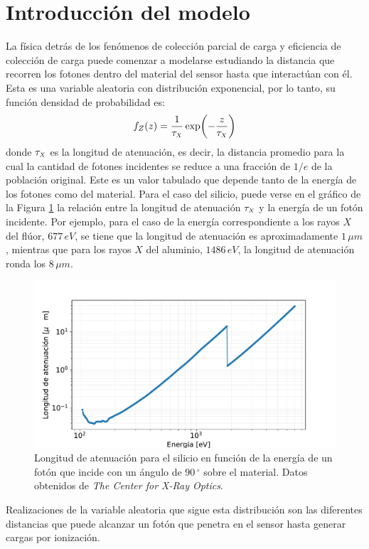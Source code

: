\section{Introducción del modelo}
\noindent La física detrás de los fenómenos de colección parcial de carga y eficiencia de colección de carga puede comenzar a modelarse estudiando la distancia que recorren los fotones dentro del material del sensor hasta que interactúan con él. Esta es una variable aleatoria con distribución exponencial, por lo tanto, su función densidad de probabilidad es:
\begin{equation}
    f_{Z}(z) = \frac{1}{\tau_{\scaleto{X}{4pt}}}\exp(-\frac{z}{\tau_{\scaleto{X}{4pt}}})
        \label{ec:DistribucionDistancias}
\end{equation}
donde $\tau_{\scaleto{X}{4pt}}$ es la longitud de atenuación, es decir, la distancia promedio para la cual la cantidad de fotones incidentes se reduce a una fracción de $1/e$ de la población original. Este es un valor tabulado que depende tanto de la energía de los fotones como del material. Para el caso del silicio, puede verse en el gráfico de la Figura \ref{fig:Attenuation} la relación entre la longitud de atenuación $\tau_{\scaleto{X}{4pt}}$ y la energía de un fotón incidente. Por ejemplo, para el caso de la energía correspondiente a los rayos $X$ del flúor, $677\,\si{eV}$, se tiene que la longitud de atenuación es aproximadamente $1\,\si{\mu m}$, mientras que para los rayos $X$ del aluminio, $1486\,\si{eV}$, la longitud de atenuación ronda los $8\,\si{\mu m}$.
\begin{figure}[h]
    \centering
        \includegraphics[scale=0.5]{Figs/AttenuationLength.pdf}
    \caption{\footnotesize{Longitud de atenuación para el silicio en función de la energía de un fotón que incide con un ángulo de $90\,^{\circ}$ sobre el material. Datos obtenidos de \textit{The Center for X-Ray Optics}\cite{AttenuationLength}.}}
    \label{fig:Attenuation}
\end{figure}
Realizaciones de la variable aleatoria que sigue esta distribución son las diferentes distancias que puede alcanzar un fotón que penetra en el sensor hasta generar cargas por ionización.

